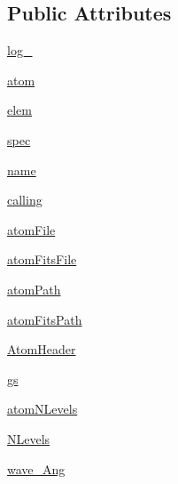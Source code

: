 \subsection*{Public Attributes}
\begin{DoxyCompactItemize}
\item 
\hyperlink{classpyneb_1_1core_1_1pynebcore_1_1___atom_data_fits_afd87151907f32bc0dc45f0171b61374e}{log\+\_\+}
\item 
\hyperlink{classpyneb_1_1core_1_1pynebcore_1_1___atom_data_fits_a0c5c7091b1d8a95d9bee2744d713f5c9}{atom}
\item 
\hyperlink{classpyneb_1_1core_1_1pynebcore_1_1___atom_data_fits_a62e73dc66c7aff7941c5ce94e808c23a}{elem}
\item 
\hyperlink{classpyneb_1_1core_1_1pynebcore_1_1___atom_data_fits_adaf1b66faf18504ec4b5c8c0b7f6763b}{spec}
\item 
\hyperlink{classpyneb_1_1core_1_1pynebcore_1_1___atom_data_fits_ab74e6bf80237ddc4109968cedc58c151}{name}
\item 
\hyperlink{classpyneb_1_1core_1_1pynebcore_1_1___atom_data_fits_ab25fa7ebe84b603684dee62410c1e34c}{calling}
\item 
\hyperlink{classpyneb_1_1core_1_1pynebcore_1_1___atom_data_fits_afa3c4660b3bcf1e2c199413048b9209e}{atom\+File}
\item 
\hyperlink{classpyneb_1_1core_1_1pynebcore_1_1___atom_data_fits_a80c24f287a25f67b489b472164691ea6}{atom\+Fits\+File}
\item 
\hyperlink{classpyneb_1_1core_1_1pynebcore_1_1___atom_data_fits_a18178a28ecf0c7f251d0974c2097b214}{atom\+Path}
\item 
\hyperlink{classpyneb_1_1core_1_1pynebcore_1_1___atom_data_fits_a8d37532338fe8cf09d17000a7ae46d53}{atom\+Fits\+Path}
\item 
\hyperlink{classpyneb_1_1core_1_1pynebcore_1_1___atom_data_fits_ae68fbd160143b3e6fdcc01eeae6e1965}{Atom\+Header}
\item 
\hyperlink{classpyneb_1_1core_1_1pynebcore_1_1___atom_data_fits_a7cdd347489383ef85cb3526af2a7a0aa}{gs}
\item 
\hyperlink{classpyneb_1_1core_1_1pynebcore_1_1___atom_data_fits_ae9ca7d9b8e6463826cd148ff606cbc1c}{atom\+N\+Levels}
\item 
\hyperlink{classpyneb_1_1core_1_1pynebcore_1_1___atom_data_fits_a4d45fe163c2108853ab418386bf4da56}{N\+Levels}
\item 
\hyperlink{classpyneb_1_1core_1_1pynebcore_1_1___atom_data_fits_ab5130f33e76a12670614a4ecf47211b0}{wave\+\_\+\+Ang}
\end{DoxyCompactItemize}


